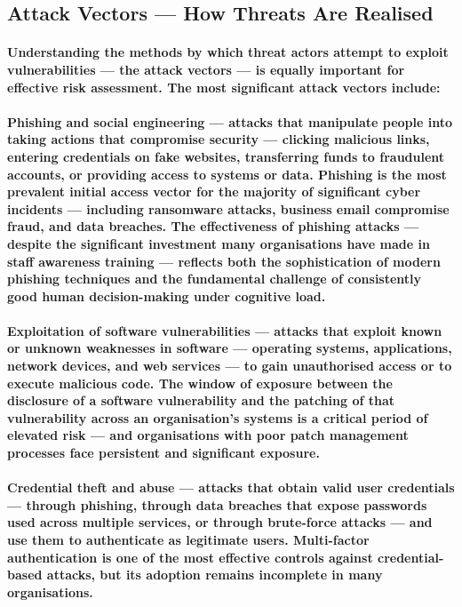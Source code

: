 \subsection{Attack Vectors — How Threats Are Realised}
\paragraph{Understanding the methods by which threat actors attempt to exploit vulnerabilities — the attack vectors — is equally important for effective risk assessment. The most significant attack vectors include:}
\paragraph{\textbf{Phishing and social engineering} — attacks that manipulate people into taking actions that compromise security — clicking malicious links, entering credentials on fake websites, transferring funds to fraudulent accounts, or providing access to systems or data. Phishing is the most prevalent initial access vector for the majority of significant cyber incidents — including ransomware attacks, business email compromise fraud, and data breaches. The effectiveness of phishing attacks — despite the significant investment many organisations have made in staff awareness training — reflects both the sophistication of modern phishing techniques and the fundamental challenge of consistently good human decision-making under cognitive load.}
\paragraph{\textbf{Exploitation of software vulnerabilities} — attacks that exploit known or unknown weaknesses in software — operating systems, applications, network devices, and web services — to gain unauthorised access or to execute malicious code. The window of exposure between the disclosure of a software vulnerability and the patching of that vulnerability across an organisation's systems is a critical period of elevated risk — and organisations with poor patch management processes face persistent and significant exposure.}
\paragraph{\textbf{Credential theft and abuse} — attacks that obtain valid user credentials — through phishing, through data breaches that expose passwords used across multiple services, or through brute-force attacks — and use them to authenticate as legitimate users. Multi-factor authentication is one of the most effective controls against credential-based attacks, but its adoption remains incomplete in many organisations.}
